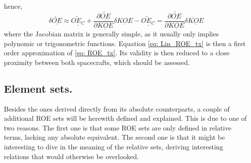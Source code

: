 \begin{itemize}
\[\]
%
\noindent hence,
%
\begin{equation}
\delta \underline{\widetilde{OE}}  \approx \underline{\widetilde{OE_C}} + \dfrac{\partial \underline{\widetilde{OE}}}{\partial \underline{KOE}} \delta \underline{KOE} - \underline{\widetilde{OE_C}} = \dfrac{\partial \underline{\widetilde{OE}}}{\partial \underline{KOE}} \delta \underline{KOE}
\label{eq: 	Lin_ROE_tx}
\end{equation}
%
\noindent where the Jacobian matrix is generally simple, as it usually only implies polynomic or trigonometric functions. Equation \eqref{eq: 	Lin_ROE_tx} is then a first order approximation of \eqref{eq: 	ROE_tx}. Its validity is then reduced to a close proximity between both spacecrafts, which should be assessed.
\end{itemize}
\subsection{Element sets.}
% 
\indent Besides the ones derived directly from its absolute counterparts, a couple of additional ROE sets will be herewith defined and explained. This is due to one of two reasons. The first one is that some ROE sets are only defined in relative terms, lacking any absolute equivalent. The second one is that it might be interesting to dive in the meaning of the relative sets, deriving interesting relations that would otherwise be overlooked.
%
